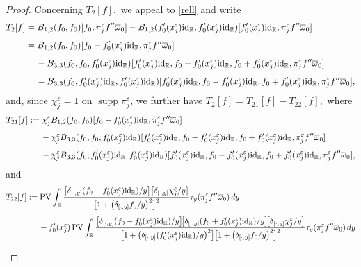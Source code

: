 \documentclass[11pt,reqno]{amsart}
\numberwithin{equation}{section}
\newcommand{\PV}{\mathop{\rm PV}\nolimits}
\newcommand{\0}{\Omega}
\newcommand{\e}{\varepsilon}
\newcommand{\ov}{\overline}
\newcommand{\oo}{\ov\omega}
\newcommand{\R}{\mathbb{R}}
\DeclareMathOperator{\supp}{supp}
\numberwithin{equation}{section}
\begin{document}
\begin{proof}
 Concerning $T_{2}[f],$ we appeal to  \eqref{rell} and   write
 \begin{align*}
  T_{2}[f]&=B_{1,2}( f_0, f_0)[ f_0,\pi_j^\e f''\oo_0]- B_{1,2}( f_0'(x_j^\e){\rm id}_{\R}, f_0'(x_j^\e){\rm id}_{\R})[ f_0'(x_j^\e){\rm id}_{\R},\pi_j^\e f''\oo_0]\\[1ex]
  &= B_{1,2}( f_0, f_0)[f_0- f_0'(x_j^\e){\rm id}_{\R},\pi_j^\e f''\oo_0]\\[1ex]
  &\hspace{0.424cm}-B_{3,3}( f_0, f_0,   f_0'(x_j^\e){\rm id}_{\R}) [f_0'(x_j^\e){\rm id}_{\R}, f_0- f_0'(x_j^\e){\rm id}_{\R},f_0+ f_0'(x_j^\e){\rm id}_{\R},\pi_j^\e f''\oo_0]\\[1ex]
  &\hspace{0.424cm} - B_{3,3}( f_0,   f_0'(x_j^\e){\rm id}_{\R},   f_0'(x_j^\e){\rm id}_{\R}) [f_0'(x_j^\e){\rm id}_{\R},f_0- f_0'(x_j^\e){\rm id}_{\R},f_0+ f_0'(x_j^\e){\rm id}_{\R}, \pi_j^\e f''\oo_0],
 \end{align*}
and, since $\chi_j^\e=1$ on $\supp \pi_j^\e$, we further have $T_{2}[f]=T_{21}[f]-T_{22}[f],$ where
  \begin{align*}
  T_{21}[f] &:= \chi_j^\e B_{1,2}( f_0, f_0)[f_0- f_0'(x_j^\e){\rm id}_{\R},\pi_j^\e f''\oo_0]\\[1ex]
  & \hspace{0.424cm}\phantom{:}-\chi_j^\e B_{3,3}( f_0, f_0,   f_0'(x_j^\e){\rm id}_{\R}) [f_0'(x_j^\e){\rm id}_{\R},f_0- f_0'(x_j^\e){\rm id}_{\R},f_0+ f_0'(x_j^\e){\rm id}_{\R},\pi_j^\e f''\oo_0]\\[1ex]
  &\hspace{0.424cm} \phantom{:}- \chi_j^\e B_{3,3}( f_0, f_0'(x_j^\e){\rm id}_{\R},   f_0'(x_j^\e){\rm id}_{\R}) [f_0'(x_j^\e){\rm id}_{\R}, f_0- f_0'(x_j^\e){\rm id}_{\R},f_0+ f_0'(x_j^\e){\rm id}_{\R},\pi_j^\e f''\oo_0],
 \end{align*}
 and 
  \begin{align*}
  T_{22}[f]&:=\PV\int_\R\frac{\big[\delta_{[\cdot,y]}(f_0- f_0'(x_j^\e){\rm id}_{\R})/y\big]\big[\delta_{[\cdot,y]}\chi_j^\e/y \big]}{\big[1+\big(\delta_{[\cdot,y]}f_0/y\big)^2\big]^2} \tau_y (\pi_j^\e f''\oo_0) \, dy\\[1ex]
  &\hspace{0.424cm} \phantom{:}-f_0'(x_j^\e)\PV\int_\R\frac{\big[\delta_{[\cdot,y]}(f_0- f_0'(x_j^\e){\rm id}_{\R})/y\big]\!\big[\delta_{[\cdot,y]}(f_0+f_0'(x_j^\e){\rm id}_{\R})/y\big]\!
  \big[\delta_{[\cdot,y]}\chi_j^\e/y \big]}{\big[1+\big(\delta_{[\cdot,y]}(f_0'(x_j^\e){\rm id}_{\R})/y\big)^2\big]
  \big[1+\big(\delta_{[\cdot,y]}f_0/y\big)^2\big]^2}  \tau_y (\pi_j^\e f''\oo_0) \, dy\\[1ex]

\end{align*}
\end{proof}
\end{document}
